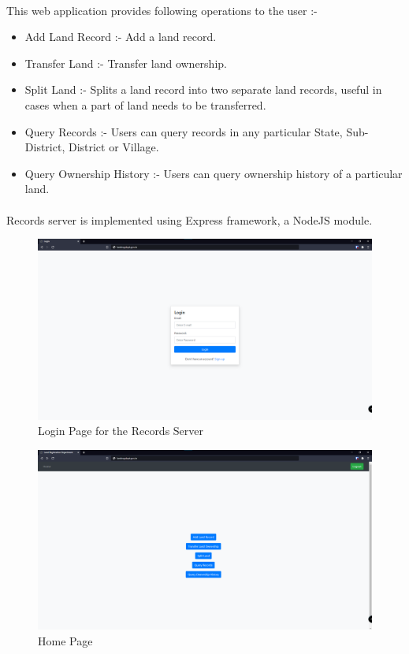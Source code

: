\documentclass{article}
\begin{document}
        \paragraph{}
        This web application provides following operations to the user :-
        \begin{itemize}
            \item Add Land Record :- Add a land record.
            \item Transfer Land :- Transfer land ownership.
            \item Split Land :- Splits a land record into two separate land records, useful in cases when a part of land needs to be transferred.
            \item Query Records :- Users can query records in any particular State, Sub-District, District or Village.
            \item Query Ownership History :- Users can query ownership history of a particular land.
        \end{itemize}

        \paragraph{}
        Records server is implemented using Express framework, a NodeJS module.

        \begin{figure}[htbp]
            \includegraphics[scale=0.25]{records_login}
            \centering
            \caption{Login Page for the Records Server}
        \end{figure}


        \begin{figure}[htbp]
            \includegraphics[scale=0.25]{records_home}
            \centering
            \caption{Home Page}
        \end{figure}
        
\end{document}
